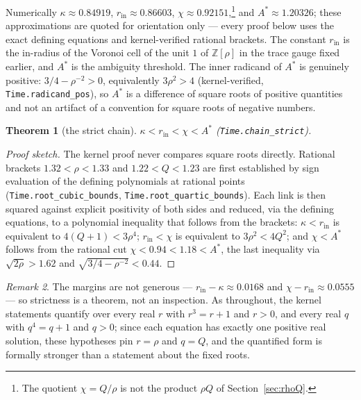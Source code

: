 \documentclass[11pt]{amsart}
\theoremstyle{plain}
\newtheorem{theorem}{Theorem}[section]
\theoremstyle{definition}
\theoremstyle{remark}
\newtheorem{remark}[theorem]{Remark}
\begin{document}
Numerically $\kappa \approx 0.84919$, $r_{\mathrm{in}} \approx 0.86603$, $\chi \approx 0.92151$,\footnote{The quotient $\chi = Q/\rho$ is not the product $\rho Q$ of Section~\ref{sec:rhoQ}.} and $A^{*} \approx 1.20326$; these approximations are quoted for orientation only --- every proof below uses the exact defining equations and kernel-verified rational brackets. The constant $r_{\mathrm{in}}$ is the in-radius of the Voronoi cell of the unit $1$ of $\mathbb{Z}[\rho]$ in the trace gauge fixed earlier, and $A^{*}$ is the ambiguity threshold. The inner radicand of $A^{*}$ is genuinely positive: $3/4 - \rho^{-2} > 0$, equivalently $3\rho^2 > 4$ (kernel-verified, \texttt{Time.radicand\_pos}), so $A^{*}$ is a difference of square roots of positive quantities and not an artifact of a convention for square roots of negative numbers.

\begin{theorem}[the strict chain]\label{thm:chain-strict}
$\kappa < r_{\mathrm{in}} < \chi < A^{*}$ \textup{(\texttt{Time.chain\_strict})}.
\end{theorem}

\begin{proof}[Proof sketch]
The kernel proof never compares square roots directly. Rational brackets $1.32 < \rho < 1.33$ and $1.22 < Q < 1.23$ are first established by sign evaluation of the defining polynomials at rational points (\texttt{Time.root\_cubic\_bounds}, \texttt{Time.root\_quartic\_bounds}). Each link is then squared against explicit positivity of both sides and reduced, via the defining equations, to a polynomial inequality that follows from the brackets: $\kappa < r_{\mathrm{in}}$ is equivalent to $4(Q+1) < 3\rho^4$; $r_{\mathrm{in}} < \chi$ is equivalent to $3\rho^2 < 4Q^2$; and $\chi < A^{*}$ follows from the rational cut $\chi < 0.94 < 1.18 < A^{*}$, the last inequality via $\sqrt{2\rho} > 1.62$ and $\sqrt{3/4 - \rho^{-2}} < 0.44$.
\end{proof}

\begin{remark}\label{rem:house-style}
The margins are not generous --- $r_{\mathrm{in}} - \kappa \approx 0.0168$ and $\chi - r_{\mathrm{in}} \approx 0.0555$ --- so strictness is a theorem, not an inspection. As throughout, the kernel statements quantify over every real $r$ with $r^3 = r + 1$ and $r > 0$, and every real $q$ with $q^4 = q + 1$ and $q > 0$; since each equation has exactly one positive real solution, these hypotheses pin $r = \rho$ and $q = Q$, and the quantified form is formally stronger than a statement about the fixed roots.
\end{remark}
\end{document}
